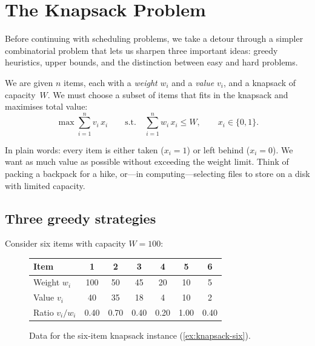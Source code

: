 
\section{The Knapsack Problem}
\label{sec:knapsack}

Before continuing with scheduling problems, we take a detour
through a simpler combinatorial problem that lets us sharpen
three important ideas: greedy heuristics, upper bounds, and the
distinction between easy and hard problems.%

\begin{definition}
\label{def:knapsack}
We are given $n$ items, each with a \emph{weight} $w_i$ and a
\emph{value} $v_i$, and a knapsack of capacity~$W$.
We must choose a subset of items that fits in the knapsack
and maximises total value:
\[
  \max \sum_{i=1}^{n} v_i\, x_i
  \qquad\text{s.t.}\quad
  \sum_{i=1}^{n} w_i\, x_i \le W,
  \qquad x_i \in \{0,1\}.
\]
\end{definition}

In plain words: every item is either taken ($x_i = 1$) or
left behind ($x_i = 0$).  We want as much value as possible
without exceeding the weight limit.  Think of packing a
backpack for a hike, or---in computing---selecting files to
store on a disk with limited capacity.

\subsection{Three greedy strategies}
\label{ssec:knapsack-greedy}

\begin{example}
\label{ex:knapsack-six}
Consider six items with capacity $W = 100$:

\begin{figure}[H]
\centering
\begin{tabular}{lcccccc}
\toprule
\textbf{Item}   & 1   & 2   & 3   & 4  & 5  & 6 \\
\midrule
Weight $w_i$     & 100 & 50  & 45  & 20 & 10 & 5 \\
Value  $v_i$     & 40  & 35  & 18  & 4  & 10 & 2 \\
Ratio $v_i/w_i$  & 0.40& 0.70& 0.40& 0.20& 1.00& 0.40\\
\bottomrule
\end{tabular}
\caption{Data for the six-item knapsack instance
         (\cref{ex:knapsack-six}).}
\label{fig:knapsack-data}
\end{figure}
\end{example}

